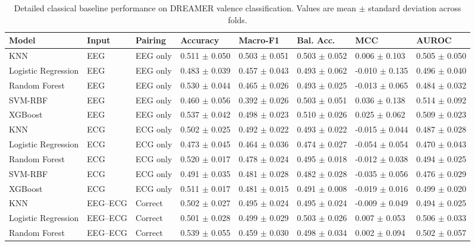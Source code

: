 \begin{table}[!t]
\centering
\caption{Detailed classical baseline performance on DREAMER valence classification. Values are mean $\pm$ standard deviation across folds.}
\label{tab:dreamer_valence_classical_detailed}
\begin{tabular}{llllllll}
\toprule
Model & Input & Pairing & Accuracy & Macro-F1 & Bal. Acc. & MCC & AUROC \\
\midrule
KNN & EEG & EEG only & 0.511 $\pm$ 0.050 & 0.503 $\pm$ 0.051 & 0.503 $\pm$ 0.052 & 0.006 $\pm$ 0.103 & 0.505 $\pm$ 0.050 \\
Logistic Regression & EEG & EEG only & 0.483 $\pm$ 0.039 & 0.457 $\pm$ 0.043 & 0.493 $\pm$ 0.062 & -0.010 $\pm$ 0.135 & 0.496 $\pm$ 0.040 \\
Random Forest & EEG & EEG only & 0.530 $\pm$ 0.044 & 0.465 $\pm$ 0.026 & 0.493 $\pm$ 0.025 & -0.013 $\pm$ 0.065 & 0.484 $\pm$ 0.032 \\
SVM-RBF & EEG & EEG only & 0.460 $\pm$ 0.056 & 0.392 $\pm$ 0.026 & 0.503 $\pm$ 0.051 & 0.036 $\pm$ 0.138 & 0.514 $\pm$ 0.092 \\
XGBoost & EEG & EEG only & 0.537 $\pm$ 0.042 & 0.498 $\pm$ 0.023 & 0.510 $\pm$ 0.026 & 0.025 $\pm$ 0.062 & 0.509 $\pm$ 0.023 \\
KNN & ECG & ECG only & 0.502 $\pm$ 0.025 & 0.492 $\pm$ 0.022 & 0.493 $\pm$ 0.022 & -0.015 $\pm$ 0.044 & 0.487 $\pm$ 0.028 \\
Logistic Regression & ECG & ECG only & 0.473 $\pm$ 0.045 & 0.464 $\pm$ 0.036 & 0.474 $\pm$ 0.027 & -0.054 $\pm$ 0.054 & 0.470 $\pm$ 0.043 \\
Random Forest & ECG & ECG only & 0.520 $\pm$ 0.017 & 0.478 $\pm$ 0.024 & 0.495 $\pm$ 0.018 & -0.012 $\pm$ 0.038 & 0.494 $\pm$ 0.025 \\
SVM-RBF & ECG & ECG only & 0.491 $\pm$ 0.035 & 0.481 $\pm$ 0.028 & 0.482 $\pm$ 0.028 & -0.035 $\pm$ 0.056 & 0.476 $\pm$ 0.029 \\
XGBoost & ECG & ECG only & 0.511 $\pm$ 0.017 & 0.481 $\pm$ 0.015 & 0.491 $\pm$ 0.008 & -0.019 $\pm$ 0.016 & 0.499 $\pm$ 0.020 \\
KNN & EEG--ECG & Correct & 0.502 $\pm$ 0.027 & 0.495 $\pm$ 0.024 & 0.495 $\pm$ 0.024 & -0.009 $\pm$ 0.049 & 0.494 $\pm$ 0.025 \\
Logistic Regression & EEG--ECG & Correct & 0.501 $\pm$ 0.028 & 0.499 $\pm$ 0.029 & 0.503 $\pm$ 0.026 & 0.007 $\pm$ 0.053 & 0.506 $\pm$ 0.033 \\
Random Forest & EEG--ECG & Correct & 0.539 $\pm$ 0.055 & 0.459 $\pm$ 0.030 & 0.498 $\pm$ 0.034 & 0.002 $\pm$ 0.094 & 0.502 $\pm$ 0.057 \\

\end{tabular}
\end{table}
